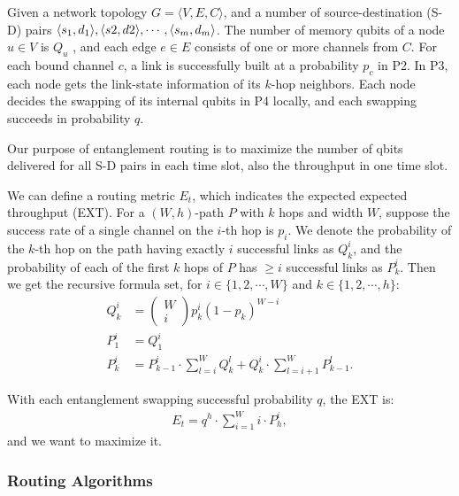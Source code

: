 \documentclass[10pt]{article}
\begin{document}
Given a network topology $G = \langle V, E, C\rangle$, and a number of source-destination (S-D) pairs $\langle s_1, d_1\rangle, \langle s2,\\ d2\rangle,\cdots, \langle s_m, d_m\rangle$. The number of memory qubits of a node $u \in V$ is $Q_u$ , and each edge $e \in E$ consists of one or more channels from $C$. For each bound channel $c$, a link is successfully built at a probability $p_c$ in P2. In P3, each node gets the link-state information of its $k$-hop neighbors. Each node decides the swapping of its internal qubits in P4 locally, and each swapping succeeds in probability $q$. 

Our purpose of entanglement routing is to maximize the number of qbits delivered for all S-D pairs in each time slot, also the throughput in one time slot.

We can define a routing metric $E_t$, which indicates the expected expected throughput (EXT). For a $(W , h)$-path $P$ with $k$ hops and width $W$, suppose the success rate of a single channel on the $i$-th hop is $p_i$.  We denote the probability of the $k$-th hop on the path having exactly $i$ successful links as $Q_k^i$, and the probability of each of the first $k$ hops of $P$ has $\geq i$ successful links
as $P_k^i$. Then we get the recursive formula set, for $i\in\{1,2,\cdots,W\}$ and $k\in\{1,2,\cdots,h\}$:
\begin{align} 
    Q_{k}^{i} &=\left(\begin{array}{c}W \\ i\end{array}\right) p_{k}^{i}\left(1-p_{k}\right)^{W-i} \\
    P_{1}^{i} &=Q_{1}^{i} \\ 
    P_{k}^{i} &=P_{k-1}^{i} \cdot \sum_{l=i}^{W} Q_{k}^{l}+Q_{k}^{i} \cdot \sum_{l=i+1}^{W} P_{k-1}^{l} .
\end{align}

With each entanglement swapping successful probability $q$, the EXT is:
\begin{align}
    E_{t}=q^{h} \cdot \sum_{i=1}^{W} i \cdot P_{h}^{i},
\end{align}
and we want to maximize it.

\subsubsection{Routing Algorithms}
\end{document}
